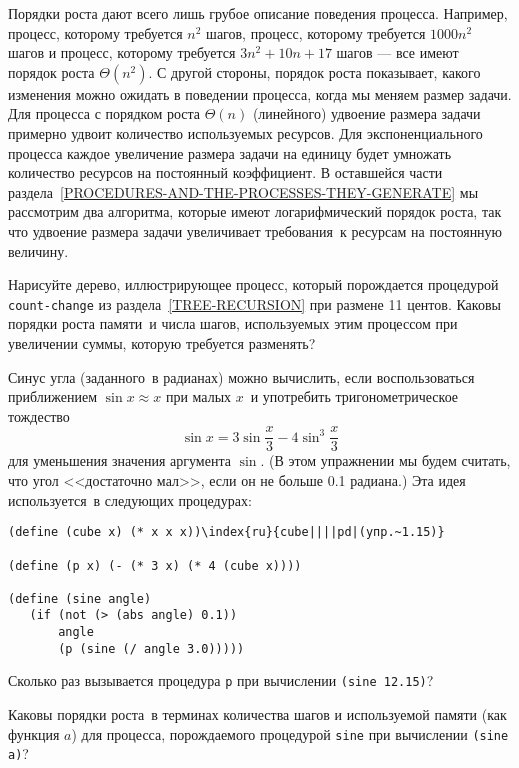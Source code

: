 Порядки роста дают всего лишь грубое описание поведения
процесса.  Например, процесс, которому требуется $n^2$
шагов, процесс, которому требуется $1000n^2$ шагов и
процесс, которому требуется $3n^2 + 10n + 17$ шагов --- все 
имеют порядок роста $\Theta(n^2)$. С другой стороны,
порядок роста показывает, какого изменения можно ожидать в
поведении процесса, когда мы меняем размер задачи.  
Для процесса с
порядком роста $\Theta(n)$ 
(линейного) удвоение размера задачи примерно удвоит количество используемых 
ресурсов.  Для экспоненциального процесса каждое увеличение размера задачи 
на единицу будет умножать количество ресурсов на постоянный коэффициент.  
В оставшейся части раздела~\ref{PROCEDURES-AND-THE-PROCESSES-THEY-GENERATE} мы
рассмотрим два алгоритма, которые имеют
логарифмический порядок роста, 
так что удвоение размера задачи увеличивает требования~к ресурсам на
постоянную величину.
\begin{exercise}{1.14}\label{EX1.14}%
Нарисуйте дерево, иллюстрирующее процесс, который порождается
процедурой {\tt count-change} из раздела~\ref{TREE-RECURSION} при размене 11 центов. Каковы
порядки роста памяти~и числа шагов, используемых этим процессом при
увеличении суммы, которую требуется разменять?
\end{exercise}
\begin{exercise}{1.15}\label{EX1.15}%
%
%
Синус угла (заданного~в радианах) можно вычислить,
если воспользоваться приближением $\sin x \approx x$ при малых
$x$~и употребить тригонометрическое тождество
$$
\sin x = 3 \sin \dfrac{x}{3} - 4 \sin ^3 \dfrac{x}{3}
$$
для уменьшения значения аргумента $\sin$. (В этом
упражнении мы будем считать, что угол <<достаточно мал>>, если он не
больше 0.1 радиана.)  Эта идея используется~в следующих процедурах:

\begin{Verbatim}[fontsize=\small]
(define (cube x) (* x x x))\index{ru}{cube||||pd|(упр.~1.15)}

(define (p x) (- (* 3 x) (* 4 (cube x))))

(define (sine angle)
   (if (not (> (abs angle) 0.1))
       angle
       (p (sine (/ angle 3.0)))))
\end{Verbatim}

\begin{plainenum}

\item
Сколько раз вызывается процедура {\tt p} при 
вычислении {\tt (sine 12.15)}?

\item
Каковы порядки роста~в терминах количества шагов и
используемой памяти (как функция $a$) для процесса,
порождаемого процедурой {\tt sine} при вычислении {\tt (sine a)}?
\end{plainenum}
\end{exercise}

